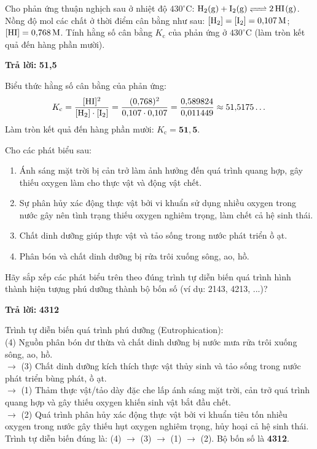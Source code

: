 \documentclass[11pt,a4paper]{article}
\begin{document}
\begin{ex}%
Cho phản ứng thuận nghịch sau ở nhiệt độ $430^\circ\text{C}$: $\ce{H2(g) + I2(g) <=> 2HI(g)}$. Nồng độ mol các chất ở thời điểm cân bằng như sau: $[\ce{H2}] = [\ce{I2}] = 0{,}107\,\text{M}$; $[\ce{HI}] = 0{,}768\,\text{M}$. Tính hằng số cân bằng $K_\text{c}$ của phản ứng ở $430^\circ\text{C}$ (làm tròn kết quả đến hàng phần mười).

\textbf{Trả lời: } \textbf{\color{hfRed}51,5}
\begin{loigiai}
Biểu thức hằng số cân bằng của phản ứng:\\
$$K_\text{c} = \dfrac{[\ce{HI}]^2}{[\ce{H2}]\cdot[\ce{I2}]} = \dfrac{(0{,}768)^2}{0{,}107 \cdot 0{,}107} = \dfrac{0{,}589824}{0{,}011449} \approx 51{,}5175\dots$$
Làm tròn kết quả đến hàng phần mười: $K_\text{c} = \mathbf{51{,}5}$.
\end{loigiai}
\end{ex}


\begin{ex}%
Cho các phát biểu sau:
\begin{enumerate}[label=(\arabic*)]
\item Ánh sáng mặt trời bị cản trở làm ảnh hưởng đến quá trình quang hợp, gây thiếu oxygen làm cho thực vật và động vật chết.
\item Sự phân hủy xác động thực vật bởi vi khuẩn sử dụng nhiều oxygen trong nước gây nên tình trạng thiếu oxygen nghiêm trọng, làm chết cả hệ sinh thái.
\item Chất dinh dưỡng giúp thực vật và tảo sống trong nước phát triển ồ ạt.
\item Phân bón và chất dinh dưỡng bị rửa trôi xuống sông, ao, hồ.
\end{enumerate}
Hãy sắp xếp các phát biểu trên theo đúng trình tự diễn biến quá trình hình thành hiện tượng phú dưỡng thành bộ bốn số (ví dụ: 2143, 4213, ...)?

\textbf{Trả lời: } \textbf{\color{hfRed}4312}
\begin{loigiai}
Trình tự diễn biến quá trình phú dưỡng (Eutrophication):\\
(4) Nguồn phân bón dư thừa và chất dinh dưỡng bị nước mưa rửa trôi xuống sông, ao, hồ.\\
$\rightarrow$ (3) Chất dinh dưỡng kích thích thực vật thủy sinh và tảo sống trong nước phát triển bùng phát, ồ ạt.\\
$\rightarrow$ (1) Thảm thực vật/tảo dày đặc che lấp ánh sáng mặt trời, cản trở quá trình quang hợp và gây thiếu oxygen khiến sinh vật bắt đầu chết.\\
$\rightarrow$ (2) Quá trình phân hủy xác động thực vật bởi vi khuẩn tiêu tốn nhiều oxygen trong nước gây thiếu hụt oxygen nghiêm trọng, hủy hoại cả hệ sinh thái.\\
Trình tự diễn biến đúng là: (4) $\rightarrow$ (3) $\rightarrow$ (1) $\rightarrow$ (2). Bộ bốn số là \textbf{4312}.
\end{loigiai}
\end{ex}
\end{document}
